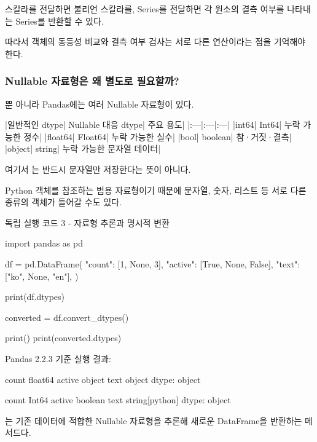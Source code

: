 스칼라를 전달하면 불리언 스칼라를, Series를 전달하면 각 원소의 결측 여부를 나타내는 Series를 반환할 수 있다.

따라서 객체의 동등성 비교와 결측 여부 검사는 서로 다른 연산이라는 점을 기억해야 한다.

\subsubsection{Nullable 자료형은 왜 별도로 필요할까?}

뿐 아니라 Pandas에는 여러 Nullable 자료형이 있다.

\begin{dhktable}
|일반적인 dtype|	Nullable 대응 dtype|	주요 용도|
|:---|:---|:---|
|int64|	Int64|	누락 가능한 정수|
|float64|	Float64|	누락 가능한 실수|
|bool|	boolean|	참·거짓·결측|
|object|	string|	누락 가능한 문자열 데이터|
\end{dhktable}

여기서 는 반드시 문자열만 저장한다는 뜻이 아니다.

Python 객체를 참조하는 범용 자료형이기 때문에 문자열, 숫자, 리스트 등 서로 다른 종류의 객체가 들어갈 수도 있다.

\begin{dhknote}
\begin{dhksmry}[centered]
독립 실행 코드 3 - 자료형 추론과 명시적 변환
\end{dhksmry}
\end{dhknote}

\begin{dhkcode}
import pandas as pd

df = pd.DataFrame({
    "count": [1, None, 3],
    "active": [True, None, False],
    "text": ["ko", None, "en"],
})

print(df.dtypes)

converted = df.convert_dtypes()

print()
print(converted.dtypes)
\end{dhkcode}

Pandas 2.2.3 기준 실행 결과:

\begin{dhkzsh}
count     float64
active     object
text       object
dtype: object

count              Int64
active           boolean
text      string[python]
dtype: object
\end{dhkzsh}

는 기존 데이터에 적합한 Nullable 자료형을 추론해 새로운 DataFrame을 반환하는 메서드다.

